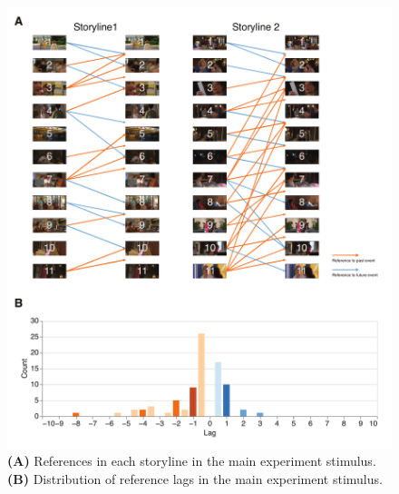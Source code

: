 \documentclass[10pt]{article}
\begin{document}
\begin{figure}[tp]
    \centering
    \includegraphics[width=\textwidth]{supp3.pdf}
    \caption{\textbf{(A)} References in each storyline in the main experiment stimulus. \textbf{(B)} Distribution of reference lags in the main experiment stimulus.}
    \label{fig:supp3}
\end{figure}
\end{document}
